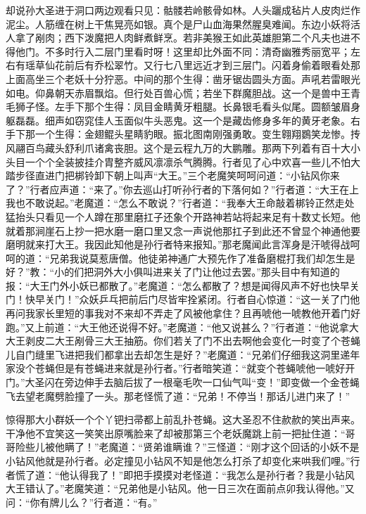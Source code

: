 \documentclass[12pt,UTF8]{ctexbook}
\begin{document}
却说孙大圣进于洞口两边观看只见：骷髅若岭骸骨如林。人头躧成毡片人皮肉烂作泥尘。人筋缠在树上干焦晃亮如银。真个是尸山血海果然腥臭难闻。东边小妖将活人拿了剐肉；西下泼魔把人肉鲜煮鲜烹。若非美猴王如此英雄胆第二个凡夫也进不得他门。不多时行入二层门里看时呀！这里却比外面不同：清奇幽雅秀丽宽平；左右有瑶草仙花前后有乔松翠竹。又行七八里远近才到三层门。闪着身偷着眼看处那上面高坐三个老妖十分狞恶。中间的那个生得：凿牙锯齿圆头方面。声吼若雷眼光如电。仰鼻朝天赤眉飘焰。但行处百兽心慌；若坐下群魔胆战。这一个是兽中王青毛狮子怪。左手下那个生得：凤目金睛黄牙粗腿。长鼻银毛看头似尾。圆额皱眉身躯磊磊。细声如窃窕佳人玉面似牛头恶鬼。这一个是藏齿修身多年的黄牙老象。右手下那一个生得：金翅鲲头星睛豹眼。振北图南刚强勇敢。变生翱翔鷃笑龙惨。抟风翮百鸟藏头舒利爪诸禽丧胆。这个是云程九万的大鹏雕。那两下列着有百十大小头目一个个全装披挂介胄整齐威风凛凛杀气腾腾。行者见了心中欢喜一些儿不怕大踏步径直进门把梆铃卸下朝上叫声“大王。”三个老魔笑呵呵问道：“小钻风你来了？”行者应声道：“来了。”你去巡山打听孙行者的下落何如？”行者道：“大王在上我也不敢说起。”老魔道：“怎么不敢说？”行者道：“我奉大王命敲着梆铃正然走处猛抬头只看见一个人蹲在那里磨扛子还象个开路神若站将起来足有十数丈长短。他就着那涧崖石上抄一把水磨一磨口里又念一声说他那扛子到此还不曾显个神通他要磨明就来打大王。我因此知他是孙行者特来报知。”那老魔闻此言浑身是汗唬得战呵呵的道：“兄弟我说莫惹唐僧。他徒弟神通广大预先作了准备磨棍打我们却怎生是好？”教：“小的们把洞外大小俱叫进来关了门让他过去罢。”那头目中有知道的报：“大王门外小妖已都散了。”老魔道：“怎么都散了？想是闻得风声不好也快早关门！快早关门！”众妖乒乓把前后门尽皆牢拴紧闭。行者自心惊道：“这一关了门他再问我家长里短的事我对不来却不弄走了风被他拿住？且再唬他一唬教他开着门好跑。”又上前道：“大王他还说得不好。”老魔道：“他又说甚么？”行者道：“他说拿大大王剥皮二大王剐骨三大王抽筋。你们若关了门不出去啊他会变化一时变了个苍蝇儿自门缝里飞进把我们都拿出去却怎生是好？”老魔道：“兄弟们仔细我这洞里递年家没个苍蝇但是有苍蝇进来就是孙行者。”行者暗笑道：“就变个苍蝇唬他一唬好开门。”大圣闪在旁边伸手去脑后拔了一根毫毛吹一口仙气叫“变！”即变做一个金苍蝇飞去望老魔劈脸撞了一头。那老怪慌了道：“兄弟！不停当！那话儿进门来了！”

惊得那大小群妖一个个丫钯扫帚都上前乱扑苍蝇。这大圣忍不住赥赥的笑出声来。干净他不宜笑这一笑笑出原嘴脸来了却被那第三个老妖魔跳上前一把扯住道：“哥哥险些儿被他瞒了！”老魔道：“贤弟谁瞒谁？”三怪道：“刚才这个回话的小妖不是小钻风他就是孙行者。必定撞见小钻风不知是他怎么打杀了却变化来哄我们哩。”行者慌了道：“他认得我了！”即把手摸摸对老怪道：“我怎么是孙行者？我是小钻风大王错认了。”老魔笑道：“兄弟他是小钻风。他一日三次在面前点卯我认得他。”又问：“你有牌儿么？”行者道：“有。”
\end{document}
